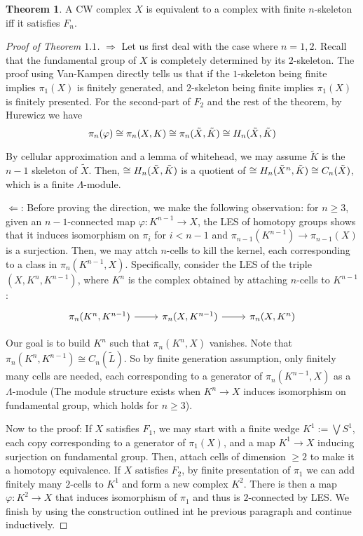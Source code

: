 \documentclass{article}
\theoremstyle{definition}
\newtheorem{theorem}{Theorem}[section]
\theoremstyle{definition}
\theoremstyle{definition}
\theoremstyle{definition}
\theoremstyle{definition}
\theoremstyle{definition}
\theoremstyle{definition}
\begin{document}
\begin{tcolorbox}[colback=red!5!white,colframe=red!30!white]
\begin{theorem}
A CW complex $X$ is equivalent to a complex with finite $n$-skeleton iff it satisfies $F_n$.
\end{theorem}
\end{tcolorbox}


\begin{proof}[Proof of Theorem $1.1$]
$\Rightarrow$    Let us first deal with the case where $n=1,2$. Recall that the fundamental group of $X$ is completely determined by its $2$-skeleton. The proof using Van-Kampen directly tells us that if the $1$-skeleton being finite implies $\pi_1(X)$ is finitely generated, and $2$-skeleton being finite implies $\pi_1(X)$ is finitely presented. For the second-part of $F_2$ and the rest of the theorem, by Hurewicz we have 
\[\pi_n(\varphi)\cong \pi_n(X,K)\cong \pi_n(\tilde{X},\Tilde{K})\cong H_n(\tilde{X},\Tilde{K})\]

By cellular approximation and a lemma of whitehead, we may assume $\tilde{K}$ is the $n-1$ skeleton of $\tilde{X}$. Then, $\cong H_n(\tilde{X},\Tilde{K})$ is a quotient of $\cong H_n(\tilde{X}^n,\Tilde{K})\cong C_n(\tilde{X})$, which is a finite $\Lambda$-module.

$\Leftarrow$: Before proving the direction, we make the following observation: for $n\geq 3$, given an $n-1$-connected map $\varphi: K^{n-1}\to X$, the LES of homotopy groups shows that it induces isomorphism on $\pi_i$ for $i< n-1$ and $\pi_{n-1}(K^{n-1})\to \pi_{n-1}(X)$ is a surjection. Then, we may attch $n$-cells to kill the kernel, each corresponding to a class in $\pi_n(K^{n-1},X)$. Specifically, consider the LES of the triple $(X,K^n,K^{n-1})$, where $K^{n}$ is the complex obtained by attaching $n$-cells to $K^{n-1}$:
\[\begin{tikzcd}
\pi_n(K^n,K^{n-1})\arrow[r]&\pi_n(X,K^{n-1})\arrow[r]&\pi_n(X,K^n)
\end{tikzcd}\]

Our goal is to build $K^n$ such that $\pi_n(K^n,X)$ vanishes. Note that $\pi_n(K^n,K^{n-1})\cong C_n(\tilde{L})$. So by finite generation assumption, only finitely many cells are needed, each corresponding to a generator of $\pi_n(K^{n-1},X)$ as a $\Lambda$-module (The module structure exists when $K^n\to X$ induces isomorphism on fundamental group, which holds for $n\geq 3$).

Now to the proof: If $X$ satisfies $F_1$, we may start with a finite wedge $K^1:=\bigvee S^1$, each copy corresponding to a generator of $\pi_1(X)$, and a map $K^1\to X$ inducing surjection on fundamental group. Then, attach cells of dimension $\geq 2$ to make it a homotopy equivalence. If $X$ satisfies $F_2$, by finite presentation of $\pi_1$ we can add finitely many $2$-cells to $K^1$ and form a new complex $K^2$. There is then a map $\varphi: K^2\to X$ that induces isomorphism of $\pi_1$ and thus is $2$-connected by LES.
We finish by using the construction outlined int he previous paragraph and continue inductively.


\end{proof}
\end{document}
